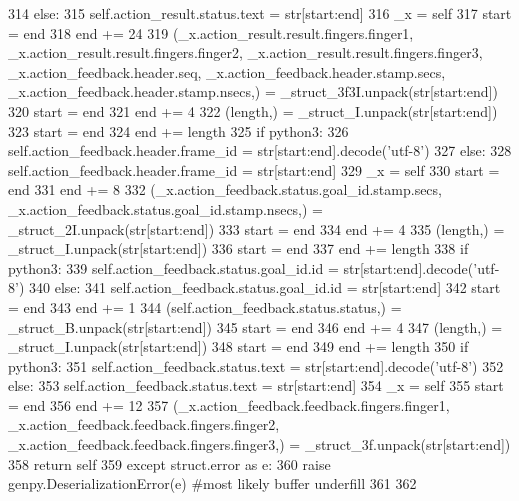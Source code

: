 \begin{DoxyCode}
314       \textcolor{keywordflow}{else}:
315         self.action\_result.status.text = str[start:end]
316       \_x = self
317       start = end
318       end += 24
319       (\_x.action\_result.result.fingers.finger1, \_x.action\_result.result.fingers.finger2, 
      \_x.action\_result.result.fingers.finger3, \_x.action\_feedback.header.seq, \_x.action\_feedback.header.stamp.secs, 
      \_x.action\_feedback.header.stamp.nsecs,) = \_struct\_3f3I.unpack(str[start:end])
320       start = end
321       end += 4
322       (length,) = \_struct\_I.unpack(str[start:end])
323       start = end
324       end += length
325       \textcolor{keywordflow}{if} python3:
326         self.action\_feedback.header.frame\_id = str[start:end].decode(\textcolor{stringliteral}{'utf-8'})
327       \textcolor{keywordflow}{else}:
328         self.action\_feedback.header.frame\_id = str[start:end]
329       \_x = self
330       start = end
331       end += 8
332       (\_x.action\_feedback.status.goal\_id.stamp.secs, \_x.action\_feedback.status.goal\_id.stamp.nsecs,) = 
      \_struct\_2I.unpack(str[start:end])
333       start = end
334       end += 4
335       (length,) = \_struct\_I.unpack(str[start:end])
336       start = end
337       end += length
338       \textcolor{keywordflow}{if} python3:
339         self.action\_feedback.status.goal\_id.id = str[start:end].decode(\textcolor{stringliteral}{'utf-8'})
340       \textcolor{keywordflow}{else}:
341         self.action\_feedback.status.goal\_id.id = str[start:end]
342       start = end
343       end += 1
344       (self.action\_feedback.status.status,) = \_struct\_B.unpack(str[start:end])
345       start = end
346       end += 4
347       (length,) = \_struct\_I.unpack(str[start:end])
348       start = end
349       end += length
350       \textcolor{keywordflow}{if} python3:
351         self.action\_feedback.status.text = str[start:end].decode(\textcolor{stringliteral}{'utf-8'})
352       \textcolor{keywordflow}{else}:
353         self.action\_feedback.status.text = str[start:end]
354       \_x = self
355       start = end
356       end += 12
357       (\_x.action\_feedback.feedback.fingers.finger1, \_x.action\_feedback.feedback.fingers.finger2, 
      \_x.action\_feedback.feedback.fingers.finger3,) = \_struct\_3f.unpack(str[start:end])
358       \textcolor{keywordflow}{return} self
359     \textcolor{keywordflow}{except} struct.error \textcolor{keyword}{as} e:
360       \textcolor{keywordflow}{raise} genpy.DeserializationError(e) \textcolor{comment}{#most likely buffer underfill}
361 
362 
\end{DoxyCode}
